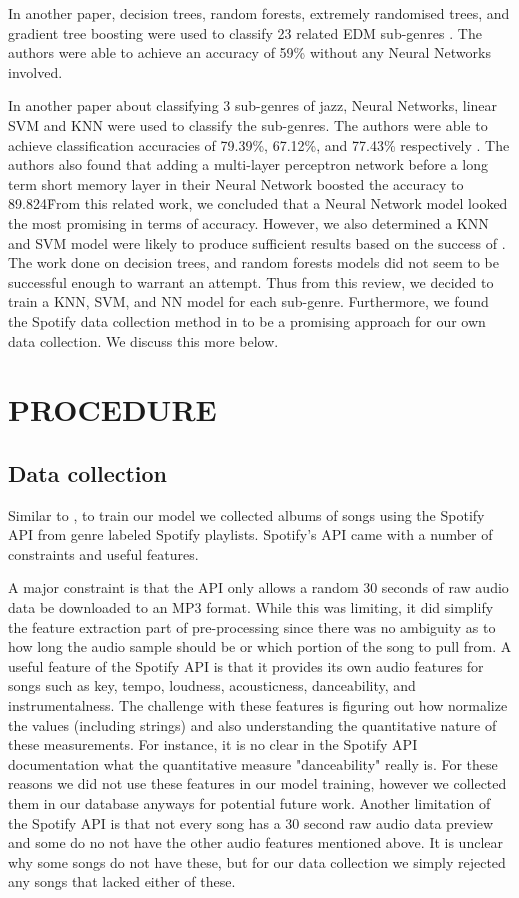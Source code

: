 \documentclass[letterpaper, 12 pt, conference]{ieeeconf}  %
\begin{document}
In another paper, decision trees, random forests, extremely randomised trees, and gradient tree boosting were used to classify 23 related EDM sub-genres \cite{c6}. The authors were able to achieve an accuracy of 59\% without any Neural Networks involved. 

In another paper about classifying 3 sub-genres of jazz, Neural Networks, linear SVM and KNN were used to classify the sub-genres. The authors were able to achieve classification accuracies of 79.39\%, 67.12\%, and 77.43\%  respectively \cite{c7}. The authors also found that adding a multi-layer perceptron network before a long term short memory layer in their Neural Network boosted the accuracy to 89.824\.%

From this related work, we concluded that a Neural Network model looked the most promising in terms of accuracy. However, we also determined a KNN and SVM model were likely to produce sufficient results based on the success of \cite{c7}. The work done on decision trees, and random forests models did not seem to be successful enough to warrant an attempt. Thus from this review, we decided to train a KNN, SVM, and NN model for each sub-genre. Furthermore, we found the Spotify data collection method in \cite{c5} to be a promising approach for our own data collection. We discuss this more below.




\section{PROCEDURE}


\subsection{Data collection}


Similar to \cite{c5}, to train our model we collected albums of songs using the Spotify API from genre labeled Spotify playlists. Spotify’s API came with a number of constraints and useful features.

A major constraint is that the API only allows a random 30 seconds of raw audio data be downloaded to an MP3 format. While this was limiting, it did simplify the feature extraction part of pre-processing since there was no ambiguity as to how long the audio sample should be or which portion of the song to pull from. A useful feature of the Spotify API is that it provides its own audio features for songs such as key, tempo, loudness, acousticness, danceability, and instrumentalness. The challenge with these features is figuring out how normalize the values (including strings) and also understanding the quantitative nature of these measurements. For instance, it is no clear in the Spotify API documentation what the quantitative measure "danceability" really is. For these reasons we did not use these features in our model training, however we collected them in our database anyways for potential future work. Another limitation of the Spotify API is that not every song has a 30 second raw audio data preview and some do no not have the other audio features mentioned above. It is unclear why some songs do not have these, but for our data collection we simply rejected any songs that lacked either of these.
\end{document}
